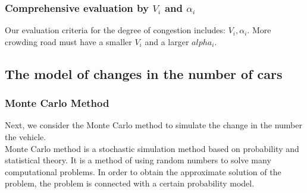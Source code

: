 \documentclass{mcmthesis}
\begin{document}
\subsubsection{Comprehensive evaluation by $V_{i}$ and $\alpha_{i}$}

\indent  Our evaluation criteria for the degree of congestion includes: $V_{i}, \alpha_{i} $. More crowding road must have a smaller $V_{i}$ and a larger $alpha_{i}$.\\

\subsection{The model of changes in the number of cars}
\label{changes of cars}
\subsubsection{Monte Carlo Method}
\indent Next, we consider the Monte Carlo method to simulate the change in the number the vehicle.\\
\indent Monte Carlo method is a stochastic simulation method based on probability and statistical theory. It is a method of using random numbers to solve many computational problems. In order to obtain the approximate solution of the problem, the problem is connected with a certain probability model. \\
\end{document}

